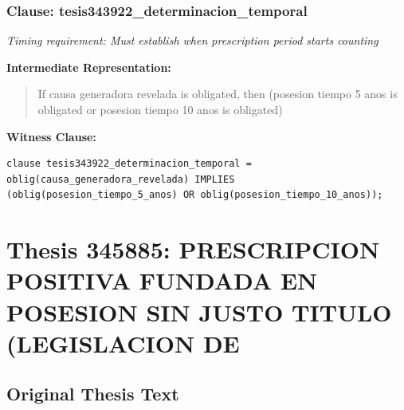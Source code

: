 \documentclass[11pt,a4paper]{article}
\begin{document}
\subsubsection{Clause: tesis343922\_determinacion\_temporal}

\textit{Timing requirement: Must establish when prescription period starts counting}

\textbf{Intermediate Representation:}

\begin{quote}
If causa generadora revelada is obligated, then (posesion tiempo 5 anos is obligated or posesion tiempo 10 anos is obligated)
\end{quote}

\textbf{Witness Clause:}

\begin{lstlisting}[style=witnessstyle, language=Witness]
clause tesis343922_determinacion_temporal = oblig(causa_generadora_revelada) IMPLIES (oblig(posesion_tiempo_5_anos) OR oblig(posesion_tiempo_10_anos));
\end{lstlisting}

\newpage

\section{Thesis 345885: PRESCRIPCION POSITIVA FUNDADA EN POSESION SIN JUSTO TITULO (LEGISLACION DE}
\label{thesis:345885}

\subsection{Original Thesis Text}
\end{document}
